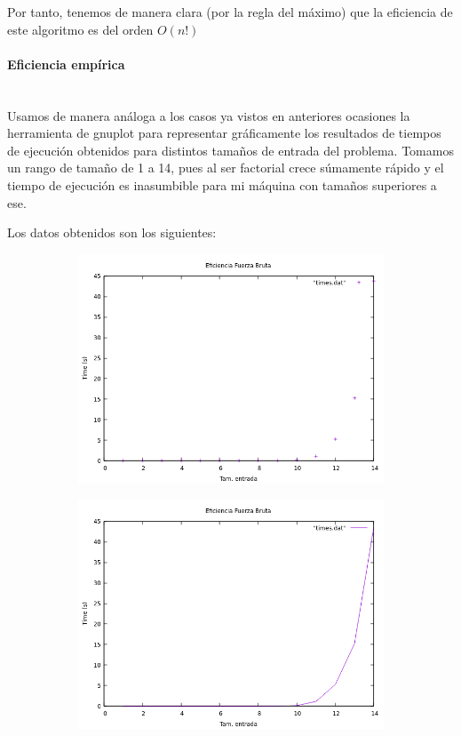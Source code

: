 \documentclass{article}
\newcommand{\myparagraph}[1]{\paragraph{#1}\mbox{}\\}
\begin{document}
Por tanto, tenemos de manera clara (por la regla del máximo) que
la eficiencia de este algoritmo es del orden $O\left( n! \right)$

\myparagraph{Eficiencia empírica}
Usamos de manera análoga a los casos ya vistos en anteriores ocasiones la herramienta de gnuplot para representar gráficamente
los resultados de tiempos de ejecución obtenidos para distintos tamaños de entrada del problema. Tomamos un rango de tamaño de 1 a 14, pues al ser factorial crece súmamente rápido y el tiempo de ejecución es inasumbible para mi máquina con tamaños superiores a ese.

Los datos obtenidos son los siguientes:

\begin{figure}[H]
    \begin{subfigure}{0.4\textwidth}
        \centering
        \includegraphics[scale = 0.40]{P3/fb_points.png}
    \end{subfigure} \hfill
    \begin{subfigure}{0.4\textwidth}
        \centering
        \includegraphics[scale = 0.40]{P3/fb_lin.png}
    \end{subfigure}
\end{figure}
\end{document}
